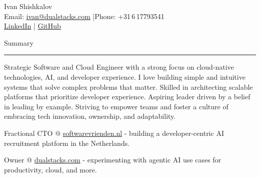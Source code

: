\documentclass[10pt,a4paper]{article}
\newcommand{\CVSection}[1]{%
  \vspace{8pt}%
  {\headingfont\textcolor{techBlue}{#1}}\\
  \rule{\linewidth}{0.5pt}%
  \vspace{4pt}%
}
\begin{document}
\small %

{\LARGE \headingfont Ivan Shishkalov} \\
\vspace{4pt}
\textcolor{softGray}{Email: \href{mailto:ivan@dualstacks.com}{ivan@dualstacks.com} 
\quad|\quad Phone: +31\,6\,17793541} \\
\textcolor{softGray}{\href{https://linkedin.com/in/ivxn-sh}{LinkedIn} \quad|\quad 
\href{https://github.com/NominalTrajectory}{GitHub}} 

\CVSection{Summary}
Strategic Software and Cloud Engineer with a strong focus on cloud-native technologies, AI, and developer experience. I love building simple and intuitive systems that solve complex problems that matter. Skilled in architecting scalable platforms that prioritize developer experience. Aspiring leader driven by a belief in leading by example. Striving to empower teams and foster a culture of embracing tech innovation, ownership, and adaptability.

Fractional CTO @ \href{https://softwarevrienden.nl}{softwarevrienden.nl} - building a developer-centric AI recruitment platform in the Netherlands.

Owner @ \href{https://dualstacks.com}{dualstacks.com} - experimenting with agentic AI use cases for productivity, cloud, and more.
\end{document}
